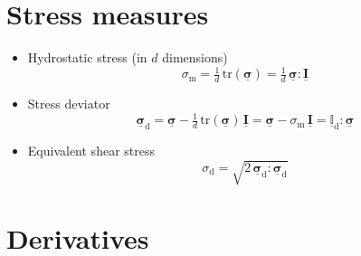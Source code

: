 \documentclass[times,namecite]{goose-article}
\newcommand\T[1]{\underline{\bm{{#1}}}}
\newcommand\TT[1]{\underline{\mathbb{{#1}}}}
\begin{document}
\section{Stress measures}
\label{sec:nomenclature::stress}

\begin{itemize}
%
\item Hydrostatic stress (in $d$ dimensions)
%
\begin{equation}
\sigma_\mathrm{m}
= \tfrac{1}{d} \, \mathrm{tr} ( \T{\sigma} )
= \tfrac{1}{d} \, \T{\sigma} : \T{I}
\end{equation}
%
\item Stress deviator
%
\begin{equation}
  \T{\sigma}_\mathrm{d}
  = \T{\sigma} - \tfrac{1}{d} \, \mathrm{tr} ( \T{\sigma} ) \, \T{I}
  = \T{\sigma} - \sigma_\mathrm{m} \, \T{I}
  = \TT{I}_\mathrm{d} : \T{\sigma}
\end{equation}
%
\item Equivalent shear stress
\begin{equation}
\sigma_\mathrm{d} = \sqrt{ 2 \, \T{\sigma}_\mathrm{d} : \T{\sigma}_\mathrm{d} }
\end{equation}
%
\end{itemize}

\section{Derivatives}
\label{sec:nomenclature:derivatives}
\end{document}
